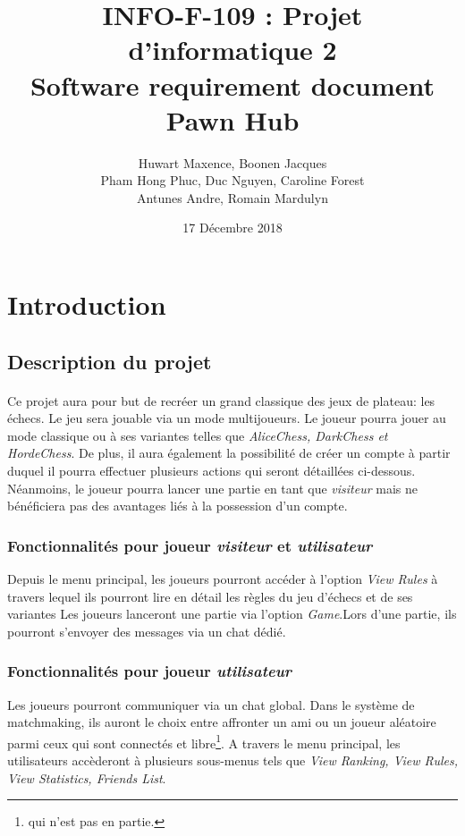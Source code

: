 \documentclass[10pt, a4paper]{article}
\title{\LARGE{INFO-F-109 : Projet d'informatique 2 }\\
       \textbf{Software requirement document\\
	   Pawn Hub}}
\author{Huwart Maxence, Boonen Jacques\\
		Pham Hong Phuc, Duc Nguyen, Caroline Forest\\
		Antunes Andre, Romain Mardulyn}
\date{17 Décembre 2018}
\begin{document}
	\maketitle
	\newpage
	\tableofcontents %
	\newpage
	\section{Introduction}
		\subsection{Description du projet}
			\paragraph{}Ce projet aura pour but de recréer un grand classique des jeux de plateau: les échecs. Le jeu sera jouable via un mode multijoueurs. Le joueur pourra jouer au mode classique ou à ses variantes telles que  {\itshape AliceChess, DarkChess et HordeChess}. De plus, il aura également la possibilité de créer un compte à partir duquel il pourra effectuer plusieurs actions qui seront détaillées ci-dessous. Néanmoins, le joueur pourra lancer une partie en tant que {\itshape visiteur} mais ne bénéficiera pas des avantages liés à la possession d'un compte.
			
			\subsubsection{Fonctionnalités pour joueur {\itshape  visiteur} et {\itshape utilisateur}}Depuis le menu principal, les joueurs pourront accéder à l'option {\itshape View Rules} à travers lequel ils pourront lire en détail les règles du jeu d'échecs et de ses variantes Les joueurs lanceront une partie via l'option {\itshape Game}.Lors d'une partie, ils pourront s'envoyer des messages via un chat dédié.
			
			\subsubsection{Fonctionnalités pour joueur {\itshape utilisateur}}Les joueurs pourront communiquer via un chat global. Dans le système de matchmaking, ils auront le choix entre affronter un ami ou un joueur aléatoire parmi ceux qui sont connectés et libre\footnote{qui n'est pas en partie.}. A travers le menu principal, les utilisateurs accèderont à plusieurs sous-menus tels que {\itshape View Ranking, View Rules, View Statistics, Friends List}.%
			
\end{document}
